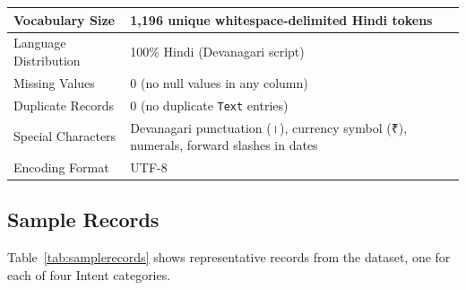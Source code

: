 \begin{longtable}{|p{6cm}|p{9cm}|}
Vocabulary Size &
1,196 unique whitespace-delimited Hindi tokens
\\ \hline

Language Distribution &
100\% Hindi (Devanagari script)
\\ \hline

Missing Values &
0 (no null values in any column)
\\ \hline

Duplicate Records &
0 (no duplicate \texttt{Text} entries)
\\ \hline

Special Characters &
Devanagari punctuation (।), currency symbol (₹), numerals, forward slashes in dates
\\ \hline

Encoding Format &
UTF-8
\\ \hline

\end{longtable}


\subsection{Sample Records}

Table~\ref{tab:samplerecords} shows representative records from the dataset, one for each of four Intent categories.

